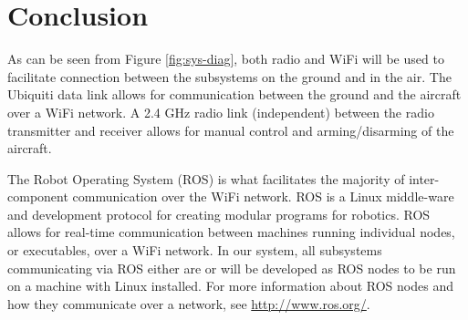 \documentclass[]{auvsi_doc}
\begin{document}
\section{Conclusion}
As can be seen from Figure \ref{fig:sys-diag}, both radio and WiFi will be used to facilitate connection between the subsystems on the ground and in the air. The Ubiquiti data link allows for communication between the ground and the aircraft over a WiFi network. A 2.4 GHz radio link (independent) between the radio transmitter and receiver allows for manual control and arming/disarming of the aircraft.

The Robot Operating System (ROS) is what facilitates the majority of inter-component communication over the WiFi network. ROS is a Linux middle-ware and development protocol for creating modular programs for robotics. ROS allows for real-time communication between machines running individual nodes, or executables, over a WiFi network. In our system, all subsystems communicating via ROS either are or will be developed as ROS nodes to be run on a machine with Linux installed. For more information about ROS nodes and how they communicate over a network, see \url{http://www.ros.org/}.
\end{document}

